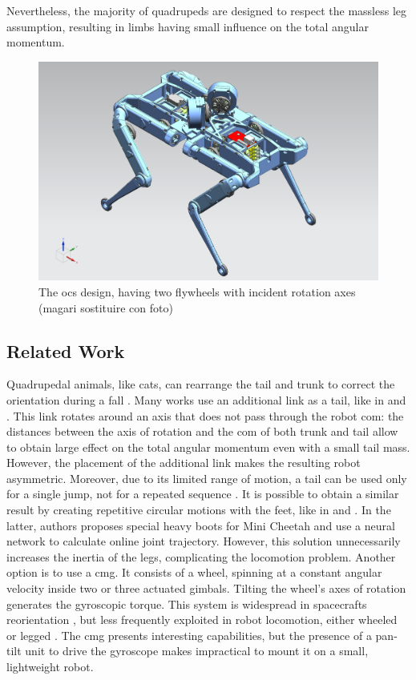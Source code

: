\documentclass[journal,letterpaper]{IEEEtran}
\begin{document}
Nevertheless, the majority of quadrupeds are designed to respect the massless leg assumption, resulting in limbs having small influence on the total angular momentum.

\begin{figure}[t!]
	\centering
	\includegraphics[width=.7\linewidth]{figures/solo_flywheels.png}
	\caption{The \acrfull{ocs} design, having two flywheels with incident rotation axes (magari sostituire con foto)}
	\label{fig:solo12flywheels}
\end{figure} 
\subsection{Related Work}
Quadrupedal animals, like cats, can rearrange the tail and trunk to correct the orientation during a fall \cite{kane1969dynamical}.
Many works use an additional link as a tail, like in \cite{chu2019null} and \cite{wenger2016frontal}.
This link rotates around an axis that does not pass through the robot \acrshort{com}: the distances between the axis of rotation and the \acrshort{com} of both trunk and tail allow to obtain large effect on the total angular momentum even with a small tail mass.
However, the placement of the additional link makes the resulting robot asymmetric. Moreover, due to its limited range of motion, a tail can be used only for a single jump, not for a repeated sequence \cite{johnson2012tail}.
It is possible to obtain a similar result by creating repetitive circular motions with the feet, like in \cite{hoffman2021exploiting} and \cite{kurtz2021mini}. In the latter, authors proposes special heavy boots for Mini Cheetah and use a neural network to calculate online joint trajectory. However, this solution unnecessarily increases the inertia of the legs, complicating the locomotion problem. 
Another option is to use a \acrfull{cmg}.
It consists of a wheel, spinning at a constant angular velocity inside two or three actuated gimbals.
Tilting the wheel's axes of rotation generates the gyroscopic torque.
This system is widespread in spacecrafts reorientation \cite{yoon2002spacecraft}, but less frequently exploited in robot locomotion, either wheeled \cite{brown1996single} or legged \cite{mikhalkov2021gyrubot}.
The \acrshort{cmg} presents interesting capabilities, but the presence of a pan-tilt unit to drive the gyroscope makes impractical to mount it on a small, lightweight robot.
\end{document}
